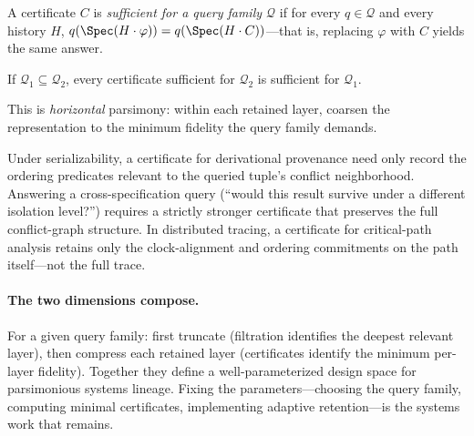 \begin{definition}
  A certificate $C$ is \emph{sufficient for a query family
  $\mathcal{Q}$} if for every $q \in \mathcal{Q}$ and every history $H$,
  $q(\Spec(H \cdot \varphi)) = q(\Spec(H \cdot C))$---that is,
  replacing $\varphi$ with $C$ yields the same answer.
\end{definition}

\begin{theorem}
  If $\mathcal{Q}_1 \subseteq \mathcal{Q}_2$, every certificate
  sufficient for $\mathcal{Q}_2$ is sufficient for $\mathcal{Q}_1$.
\end{theorem}

\noindent
This is \emph{horizontal} parsimony: within each retained layer,
coarsen the representation to the minimum fidelity the query family
demands.

\begin{example}
  Under serializability, a certificate for derivational provenance need
  only record the ordering predicates relevant to the queried tuple's
  conflict neighborhood.
  Answering a cross-specification query (``would this result survive
  under a different isolation level?'') requires a strictly stronger
  certificate that preserves the full conflict-graph structure.
  In distributed tracing, a certificate for critical-path analysis
  retains only the clock-alignment and ordering commitments on the
  path itself---not the full trace.
\end{example}

\paragraph{The two dimensions compose.}
For a given query family: first truncate (filtration identifies the
deepest relevant layer), then compress each retained layer (certificates
identify the minimum per-layer fidelity).
Together they define a well-parameterized design space for parsimonious
systems lineage.
Fixing the parameters---choosing the query family, computing minimal
certificates, implementing adaptive retention---is the systems work
that remains.
